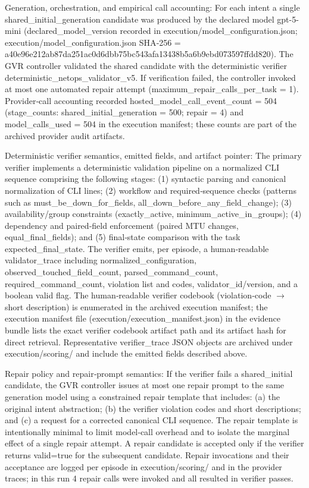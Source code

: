 \documentclass[conference]{IEEEtran}
\begin{document}
Generation, orchestration, and empirical call accounting: For each intent a single shared\_initial\_generation candidate was produced by the declared model gpt-5-mini (declared\_model\_version recorded in execution/model\_configuration.json; execution/model\_configuration.json SHA‑256 = a40e96e2\allowbreak{}12ab87da\allowbreak{}251ac0d6\allowbreak{}dbb75bc5\allowbreak{}43afa134\allowbreak{}38b5a6b9\allowbreak{}ebd07359\allowbreak{}7ffdd820). The GVR controller validated the shared candidate with the deterministic verifier deterministic\_netops\_validator\_v5. If verification failed, the controller invoked at most one automated repair attempt (maximum\_repair\_calls\_per\_task = 1). Provider‑call accounting recorded hosted\_model\_call\_event\_count = 504 (stage\_counts: shared\_initial\_generation = 500; repair = 4) and model\_calls\_used = 504 in the execution manifest; these counts are part of the archived provider audit artifacts.

Deterministic verifier semantics, emitted fields, and artifact pointer: The primary verifier implements a deterministic validation pipeline on a normalized CLI sequence comprising the following stages: (1) syntactic parsing and canonical normalization of CLI lines; (2) workflow and required‑sequence checks (patterns such as must\_be\_down\_for\_fields, all\_down\_before\_any\_field\_change); (3) availability/group constraints (exactly\_active, minimum\_active\_in\_groups); (4) dependency and paired‑field enforcement (paired MTU changes, equal\_final\_fields); and (5) final‑state comparison with the task expected\_final\_state. The verifier emits, per episode, a human‑readable validator\_trace including normalized\_configuration, observed\_touched\_field\_count, parsed\_command\_count, required\_command\_count, violation list and codes, validator\_id/version, and a boolean valid flag. The human‑readable verifier codebook (violation‑code \ensuremath{\rightarrow} short description) is enumerated in the archived execution manifest; the execution manifest file (execution/execution\_manifest.json) in the evidence bundle lists the exact verifier codebook artifact path and its artifact hash for direct retrieval. Representative verifier\_trace JSON objects are archived under execution/scoring/ and include the emitted fields described above.

Repair policy and repair‑prompt semantics: If the verifier fails a shared\_initial candidate, the GVR controller issues at most one repair prompt to the same generation model using a constrained repair template that includes: (a) the original intent abstraction; (b) the verifier violation codes and short descriptions; and (c) a request for a corrected canonical CLI sequence. The repair template is intentionally minimal to limit model‑call overhead and to isolate the marginal effect of a single repair attempt. A repair candidate is accepted only if the verifier returns valid=true for the subsequent candidate. Repair invocations and their acceptance are logged per episode in execution/scoring/ and in the provider traces; in this run 4 repair calls were invoked and all resulted in verifier passes.
\end{document}
